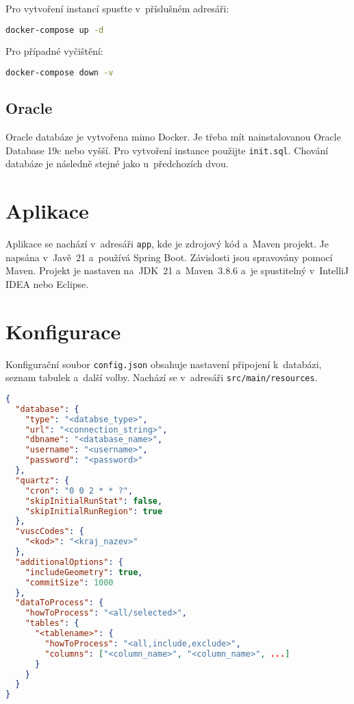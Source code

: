 Pro vytvoření instancí spusťte v~příslušném adresáři:
\begin{lstlisting}[language=bash]
docker-compose up -d
\end{lstlisting}

Pro případné vyčištění:
\begin{lstlisting}[language=bash]
docker-compose down -v
\end{lstlisting}

\subsection*{Oracle}
Oracle databáze je vytvořena mimo Docker. Je třeba mít nainstalovanou Oracle Database 19c nebo vyšší. Pro vytvoření instance použijte \texttt{init.sql}. Chování databáze je následně stejné jako u~předchozích dvou.

\section*{Aplikace}
Aplikace se nachází v~adresáři \texttt{app}, kde je zdrojový kód a~Maven projekt. Je napsána v~Javě~21 a~používá Spring Boot. Závislosti jsou spravovány pomocí Maven. Projekt je nastaven na~JDK~21 a~Maven~3.8.6 a~je spustitelný v~IntelliJ IDEA nebo Eclipse.

\section*{Konfigurace}
Konfigurační soubor \texttt{config.json} obsahuje nastavení připojení k~databázi, seznam tabulek a~další volby. Nachází se v~adresáři \texttt{src/main/resources}.

\newpage

\begin{lstlisting}[language=json, caption={Příklad konfiguračního souboru}]
{
  "database": {
    "type": "<databse_type>",
    "url": "<connection_string>",
    "dbname": "<database_name>",
    "username": "<username>",
    "password": "<password>"
  },
  "quartz": {
    "cron": "0 0 2 * * ?",
    "skipInitialRunStat": false,
    "skipInitialRunRegion": true
  },
  "vuscCodes": {
    "<kod>": "<kraj_nazev>"
  },
  "additionalOptions": {
    "includeGeometry": true,
    "commitSize": 1000
  },
  "dataToProcess": {
    "howToProcess": "<all/selected>",
    "tables": {
      "<tablename>": {
        "howToProcess": "<all,include,exclude>",
        "columns": ["<column_name>", "<column_name>", ...]
      }
    }
  }
}
\end{lstlisting}

